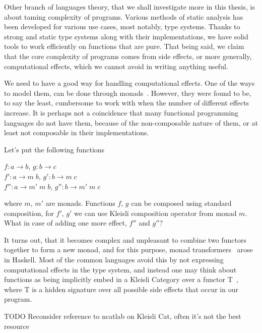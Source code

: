 \documentclass[declaration,shortabstract]{iithesis}
\theoremstyle{definition} \newtheorem{definition}{Definition}[chapter]
\theoremstyle{remark} \newtheorem{remark}[definition]{Observation}
\theoremstyle{plain} \newtheorem{theorem}[definition]{Theorem}
\theoremstyle{plain} \newtheorem{lemma}[definition]{Lemma}
\begin{document}
Other branch of languages theory, that we shall investigate more in this thesis,
is about taming complexity of programs. Various methods of static analysis has
been developed for various use cases, most notably, type systems. Thanks to strong
and static type systems along with their implementations, we have solid tools to
work efficiently on functions that are pure. That being said, we claim that the
core complexity of programs comes from side effects, or more generally, computational
effects, which we cannot avoid in writing anything useful.

We need to have a good way for handling computational effects. One of the ways
to model them, can be done through monads~\cite{monads-wadler, moggi}. However,
they were found to be, to say the least, cumbersome to work with when the number
of different effects increase. It is perhaps not a coincidence that many
functional programming languages do not have them, because of the non-composable
nature of them, or at least not composable in their implementations.

\noindent
Let's put the following functions

\begin{center}

    $ f: a \rightarrow b $, $ g : b \rightarrow c $ \\
    $ f': a \rightarrow m \; b $, $ g' : b \rightarrow m \; c $ \\
    $ f'': a \rightarrow m' \; m \; b $, $ g'' : b \rightarrow m' \; m \; c $ \\

\end{center}

\noindent
where $m$, $m'$ are monads. Functions $f$, $g$ can be composed using standard
composition, for $f'$, $g'$ we can use Kleisli composition operator from monad $m$.
What in case of adding one more effect, $f''$ and $g''$?

It turns out, that it becomes complex and unpleasant to combine two functors
together to form a new monad, and for this purpose, monad
transformers~\cite{monad-transformers} arose in Haskell. Most of the common
languages avoid this by not expressing computational effects in the type system,
and instead one may think about functions as being implicitly embed in a Kleisli
Category over a functor T~\cite{kleisli-ncatlab}, where T is a hidden signature
over all possible side effects that occur in our program.

\noindent
TODO Reconsider reference to ncatlab on Kleisli Cat, often it's not the best resource
\end{document}
